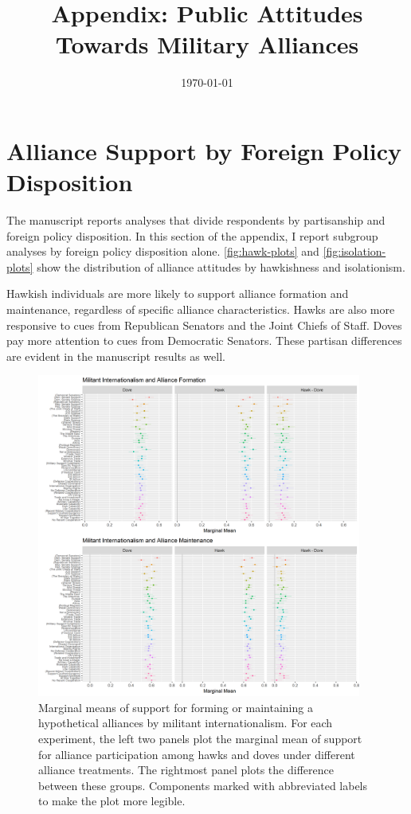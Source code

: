 \documentclass[12pt]{article}
\title{\textbf{Appendix: Public Attitudes Towards Military Alliances}}
\author{}
\date{\today}
\begin{document}
\maketitle 

\doublespace 




\section{Alliance Support by Foreign Policy Disposition} 


The manuscript reports analyses that divide respondents by partisanship and foreign policy disposition. 
In this section of the appendix, I report subgroup analyses by foreign policy disposition alone. 
\autoref{fig:hawk-plots} and \autoref{fig:isolation-plots} show the distribution of alliance attitudes by hawkishness and isolationism. 


Hawkish individuals are more likely to support alliance formation and maintenance, regardless of specific alliance characteristics. 
Hawks are also more responsive to cues from Republican Senators and the Joint Chiefs of Staff. 
Doves pay more attention to cues from Democratic Senators.
These partisan differences are evident in the manuscript results as well. 


\begin{figure}
	\centering
		\includegraphics[width=0.95\textwidth]{hawk-plots.png}
	\caption{Marginal means of support for forming or maintaining a hypothetical alliances by militant internationalism. For each experiment, the left two panels plot the marginal mean of support for alliance participation among hawks and doves under different alliance treatments. The rightmost panel plots the difference between these groups. Components marked with abbreviated labels to make the plot more legible.}
	\label{fig:hawk-plots}
\end{figure}
\end{document}
